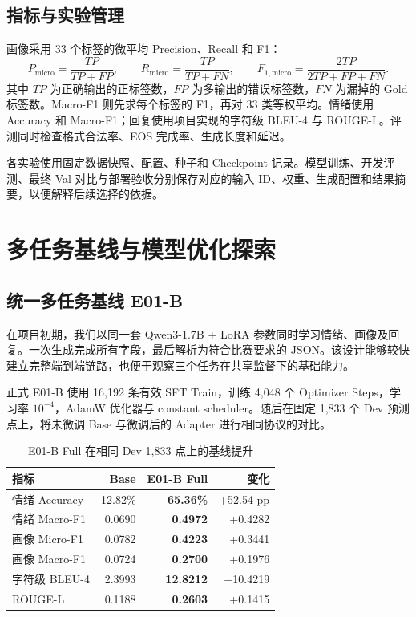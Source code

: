 \documentclass[UTF8,a4paper,zihao=-4,oneside]{ctexrep}
\begin{document}
\section{指标与实验管理}
画像采用 33 个标签的微平均 Precision、Recall 和 F1：
\begin{equation}
 P_{\mathrm{micro}}=\frac{TP}{TP+FP},\qquad
 R_{\mathrm{micro}}=\frac{TP}{TP+FN},\qquad
 F_{1,\mathrm{micro}}=\frac{2TP}{2TP+FP+FN}.
\end{equation}
其中 $TP$ 为正确输出的正标签数，$FP$ 为多输出的错误标签数，$FN$ 为漏掉的 Gold 标签数。Macro-F1 则先求每个标签的 F1，再对 33 类等权平均。情绪使用 Accuracy 和 Macro-F1；回复使用项目实现的字符级 BLEU-4 与 ROUGE-L。评测同时检查格式合法率、EOS 完成率、生成长度和延迟。

各实验使用固定数据快照、配置、种子和 Checkpoint 记录。模型训练、开发评测、最终 Val 对比与部署验收分别保存对应的输入 ID、权重、生成配置和结果摘要，以便解释后续选择的依据。

\chapter{多任务基线与模型优化探索}
\section{统一多任务基线 E01-B}
在项目初期，我们以同一套 Qwen3-1.7B + LoRA 参数同时学习情绪、画像及回复。一次生成完成所有字段，最后解析为符合比赛要求的 JSON。该设计能够较快建立完整端到端链路，也便于观察三个任务在共享监督下的基础能力。

正式 E01-B 使用 16,192 条有效 SFT Train，训练 4,048 个 Optimizer Steps，学习率 $10^{-4}$，AdamW 优化器与 constant scheduler。随后在固定 1,833 个 Dev 预测点上，将未微调 Base 与微调后的 Adapter 进行相同协议的对比。

\begin{table}[htbp]\centering\caption{E01-B Full 在相同 Dev 1,833 点上的基线提升}\label{tab:e01-base}
\begin{tabularx}{\linewidth}{Yrrr}
\toprule
指标 & Base & E01-B Full & 变化\\\midrule
情绪 Accuracy & 12.82\% & \textbf{65.36\%} & +52.54 pp\\
情绪 Macro-F1 & 0.0690 & \textbf{0.4972} & +0.4282\\
画像 Micro-F1 & 0.0782 & \textbf{0.4223} & +0.3441\\
画像 Macro-F1 & 0.0724 & \textbf{0.2700} & +0.1976\\
字符级 BLEU-4 & 2.3993 & \textbf{12.8212} & +10.4219\\
ROUGE-L & 0.1188 & \textbf{0.2603} & +0.1415\\
\bottomrule
\end{tabularx}
\end{table}
\end{document}
